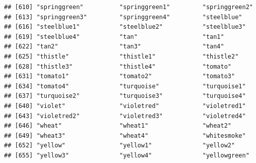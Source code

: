 \documentclass[
]{article}
\begin{document}
\begin{verbatim}
## [610] "springgreen"          "springgreen1"         "springgreen2"        
## [613] "springgreen3"         "springgreen4"         "steelblue"           
## [616] "steelblue1"           "steelblue2"           "steelblue3"          
## [619] "steelblue4"           "tan"                  "tan1"                
## [622] "tan2"                 "tan3"                 "tan4"                
## [625] "thistle"              "thistle1"             "thistle2"            
## [628] "thistle3"             "thistle4"             "tomato"              
## [631] "tomato1"              "tomato2"              "tomato3"             
## [634] "tomato4"              "turquoise"            "turquoise1"          
## [637] "turquoise2"           "turquoise3"           "turquoise4"          
## [640] "violet"               "violetred"            "violetred1"          
## [643] "violetred2"           "violetred3"           "violetred4"          
## [646] "wheat"                "wheat1"               "wheat2"              
## [649] "wheat3"               "wheat4"               "whitesmoke"          
## [652] "yellow"               "yellow1"              "yellow2"             
## [655] "yellow3"              "yellow4"              "yellowgreen"
\end{verbatim}
\end{document}
